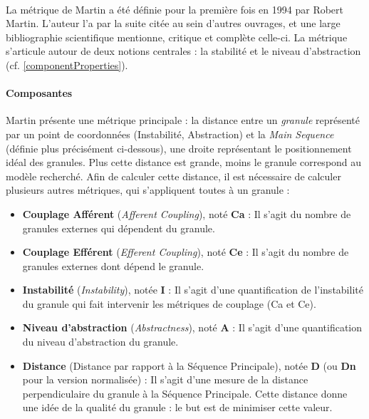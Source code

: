 \documentclass{scrartcl}
\begin{document}
    \paragraph{}La métrique de Martin a été définie pour la première fois en 1994 par Robert Martin\cite{Martin:1994}. L'auteur l'a par la suite citée au sein d'autres ouvrages\cite{Martin:2003}, et une large bibliographie scientifique mentionne, critique et complète celle-ci\cite{HyryLepp:2009}\cite{BUmetric:2016}\cite{KaurShar:2015}\cite{Spinellis:2006}\cite{Pressman:2000}. La métrique s'articule autour de deux notions centrales : la stabilité et le niveau d'abstraction (cf. \ref{componentProperties}).


    \paragraph{Composantes}Martin présente une métrique principale : la distance entre un \textit{granule} représenté par un point de coordonnées (Instabilité, Abstraction) et la \emph{Main Sequence} (définie plus précisément ci-dessous), une droite représentant le positionnement idéal des granules. Plus cette distance est grande, moins le granule correspond au modèle recherché. Afin de calculer cette distance, il est nécessaire de calculer plusieurs autres métriques, qui s'appliquent toutes à un granule :
    \begin{itemize}
        \item \textbf{Couplage Afférent} (\emph{Afferent Coupling}), noté \textbf{Ca} : Il s'agit du nombre de granules externes qui dépendent du granule.
        \item \textbf{Couplage Efférent} (\emph{Efferent Coupling}), noté \textbf{Ce} : Il s'agit du nombre de granules externes dont dépend le granule.
        \item \textbf{Instabilité} (\emph{Instability}), notée \textbf{I} : Il s'agit d'une quantification de l'instabilité du granule qui fait intervenir les métriques de couplage (Ca et Ce).
        \item \textbf{Niveau d'abstraction} (\emph{Abstractness}), noté \textbf{A} : Il s'agit d'une quantification du niveau d'abstraction du granule.
        \item \textbf{Distance} (Distance par rapport à la Séquence Principale), notée \textbf{D} (ou \textbf{Dn} pour la version normalisée) : Il s'agit d'une mesure de la distance perpendiculaire du granule à la Séquence Principale. Cette distance donne une idée de la qualité du granule : le but est de minimiser cette valeur.
    \end{itemize}
\end{document}
